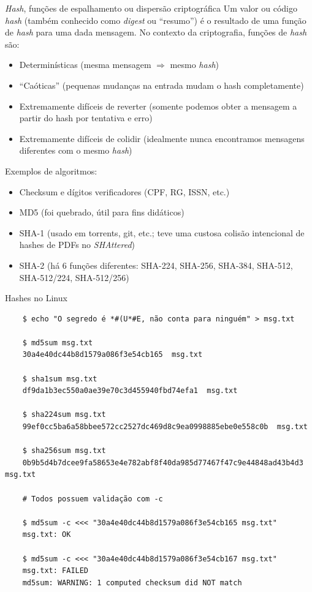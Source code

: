 \documentclass[utf8]{beamer}
\begin{document}
\begin{frame}{\emph{Hash},
              funções de espalhamento ou dispersão criptográfica}
  Um valor ou código \emph{hash}
  (também conhecido como \emph{digest} ou ``resumo'')
  é o resultado de uma função de \emph{hash} para uma dada mensagem.
  No contexto da criptografia, funções de \emph{hash} são:
  \begin{itemize}
    \item Determinísticas
          (mesma mensagem $\Rightarrow$ mesmo \emph{hash})
    \item ``Caóticas'' (pequenas mudanças na entrada
                        mudam o hash completamente)
    \item Extremamente difíceis de reverter
          (somente podemos obter a mensagem a partir do hash
           por tentativa e erro)
    \item Extremamente difíceis de colidir
          (idealmente nunca encontramos
           mensagens diferentes com o mesmo \emph{hash})
  \end{itemize}
  \vfill
  Exemplos de algoritmos:
  \begin{itemize}
    \item Checksum e dígitos verificadores (CPF, RG, ISSN, etc.)
    \item MD5 (foi quebrado, útil para fins didáticos)
    \item SHA-1 (usado em torrents, git, etc.;
                 teve uma custosa colisão intencional de hashes de PDFs
                 no \emph{SHAttered})
    \item SHA-2 (há $6$ funções diferentes:
                 SHA-224, SHA-256, SHA-384, SHA-512,
                 SHA-512/224, SHA-512/256)
  \end{itemize}
\end{frame}


\begin{frame}[fragile]{Hashes no Linux}
  \begin{verbatim}
    $ echo "O segredo é *#(U*#E, não conta para ninguém" > msg.txt

    $ md5sum msg.txt
    30a4e40dc44b8d1579a086f3e54cb165  msg.txt

    $ sha1sum msg.txt
    df9da1b3ec550a0ae39e70c3d455940fbd74efa1  msg.txt

    $ sha224sum msg.txt
    99ef0cc5ba6a58bbee572cc2527dc469d8c9ea0998885ebe0e558c0b  msg.txt

    $ sha256sum msg.txt
    0b9b5d4b7dcee9fa58653e4e782abf8f40da985d77467f47c9e44848ad43b4d3  msg.txt

    # Todos possuem validação com -c

    $ md5sum -c <<< "30a4e40dc44b8d1579a086f3e54cb165 msg.txt"
    msg.txt: OK

    $ md5sum -c <<< "30a4e40dc44b8d1579a086f3e54cb167 msg.txt"
    msg.txt: FAILED
    md5sum: WARNING: 1 computed checksum did NOT match
  \end{verbatim}
\end{frame}
\end{document}
